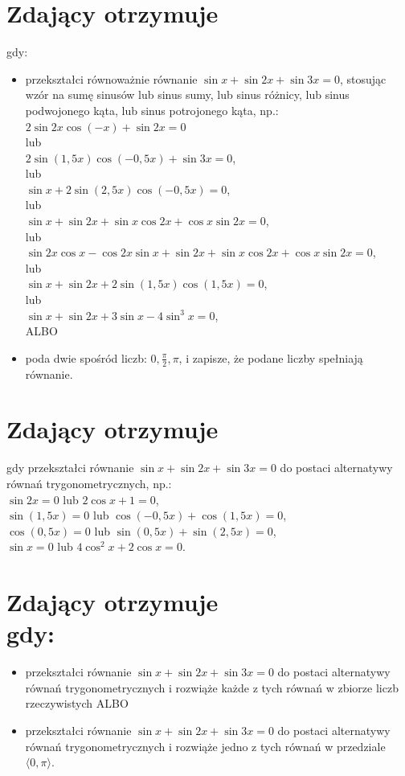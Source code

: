 \documentclass[10pt]{article}
\begin{document}
\section*{Zdający otrzymuje}
gdy:

\begin{itemize}
  \item przekształci równoważnie równanie $\sin x+\sin 2 x+\sin 3 x=0$, stosując wzór na sumę sinusów lub sinus sumy, lub sinus różnicy, lub sinus podwojonego kąta, lub sinus potrojonego kąta, np.:\\
$2 \sin 2 x \cos (-x)+\sin 2 x=0$\\
lub\\
$2 \sin (1,5 x) \cos (-0,5 x)+\sin 3 x=0$,\\
lub\\
$\sin x+2 \sin (2,5 x) \cos (-0,5 x)=0$,\\
lub\\
$\sin x+\sin 2 x+\sin x \cos 2 x+\cos x \sin 2 x=0$,\\
lub\\
$\sin 2 x \cos x-\cos 2 x \sin x+\sin 2 x+\sin x \cos 2 x+\cos x \sin 2 x=0$,\\
lub\\
$\sin x+\sin 2 x+2 \sin (1,5 x) \cos (1,5 x)=0$,\\
lub\\
$\sin x+\sin 2 x+3 \sin x-4 \sin ^{3} x=0$,\\
ALBO
  \item poda dwie spośród liczb: $0, \frac{\pi}{2}, \pi$, i zapisze, że podane liczby spełniają równanie.
\end{itemize}

\section*{Zdający otrzymuje}
gdy przekształci równanie $\sin x+\sin 2 x+\sin 3 x=0$ do postaci alternatywy równań trygonometrycznych, np.:\\
$\sin 2 x=0$ lub $2 \cos x+1=0$,\\
$\sin (1,5 x)=0$ lub $\cos (-0,5 x)+\cos (1,5 x)=0$,\\
$\cos (0,5 x)=0$ lub $\sin (0,5 x)+\sin (2,5 x)=0$,\\
$\sin x=0$ lub $4 \cos ^{2} x+2 \cos x=0$.

\section*{Zdający otrzymuje \\
 gdy:}
\begin{itemize}
  \item przekształci równanie $\sin x+\sin 2 x+\sin 3 x=0$ do postaci alternatywy równań trygonometrycznych i rozwiąże każde z tych równań w zbiorze liczb rzeczywistych ALBO
  \item przekształci równanie $\sin x+\sin 2 x+\sin 3 x=0$ do postaci alternatywy równań trygonometrycznych i rozwiąże jedno z tych równań w przedziale $\langle 0, \pi\rangle$.
\end{itemize}
\end{document}
